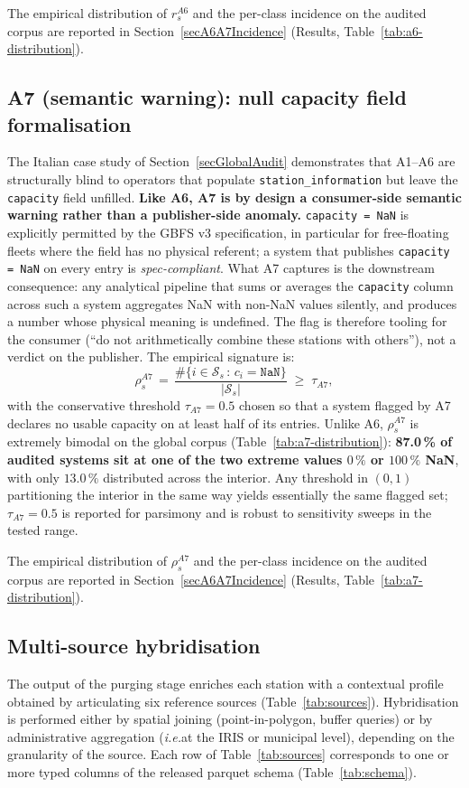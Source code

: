 \documentclass[11pt,a4paper]{article}
\newcommand{\ie}{\emph{i.e.}}
\begin{document}
The empirical distribution of $r_s^{A6}$ and the per-class
incidence on the audited corpus are reported in
Section~\ref{secA6A7Incidence} (Results,
Table~\ref{tab:a6-distribution}).

\subsection{A7 (semantic warning): null capacity field formalisation}\label{secA7Formalisation}
The Italian case study of Section~\ref{secGlobalAudit} demonstrates
that A1--A6 are structurally blind to operators that populate
\texttt{station\_information} but leave the \texttt{capacity} field
unfilled. \textbf{Like A6, A7 is by design a consumer-side
semantic warning rather than a publisher-side anomaly.} \texttt{capacity = NaN} is
explicitly permitted by the GBFS v3 specification, in particular
for free-floating fleets where the field has no physical referent;
a system that publishes \texttt{capacity = NaN} on every entry is
\emph{spec-compliant}. What A7 captures is the downstream
consequence: any analytical pipeline that sums or averages the
\texttt{capacity} column across such a system aggregates NaN with
non-NaN values silently, and produces a number whose physical
meaning is undefined. The flag is therefore tooling for the
consumer (``do not arithmetically combine these stations with
others''), not a verdict on the publisher. The empirical signature
is:
\begin{equation}
\rho_s^{A7} \,=\,
\frac{\#\{i \in \mathcal{S}_s \,:\, c_i = \mathtt{NaN}\}}{|\mathcal{S}_s|}
\;\geq\; \tau_{A7},
\end{equation}
with the conservative threshold $\tau_{A7} = 0.5$ chosen so that a
system flagged by A7 declares no usable capacity on at least half
of its entries. Unlike A6, $\rho_s^{A7}$ is extremely bimodal on
the global corpus
(Table~\ref{tab:a7-distribution}): \textbf{87.0\,\% of audited
systems sit at one of the two extreme values $0\,\%$ or $100\,\%$
NaN}, with only $13.0\,\%$ distributed across the interior. Any
threshold in $(0, 1)$ partitioning the interior in the same way
yields essentially the same flagged set; $\tau_{A7} = 0.5$ is
reported for parsimony and is robust to sensitivity sweeps in the
tested range.

The empirical distribution of $\rho_s^{A7}$ and the
per-class incidence on the audited corpus are reported in
Section~\ref{secA6A7Incidence} (Results,
Table~\ref{tab:a7-distribution}).

\subsection{Multi-source hybridisation}
The output of the purging stage enriches each station with a
contextual profile obtained by articulating six reference sources
(Table~\ref{tab:sources}). Hybridisation is performed either by
spatial joining (point-in-polygon, buffer queries) or by
administrative aggregation (\ie at the IRIS or municipal level),
depending on the granularity of the source. Each row of
Table~\ref{tab:sources} corresponds to one or more typed columns
of the released parquet schema (Table~\ref{tab:schema}).
\end{document}

